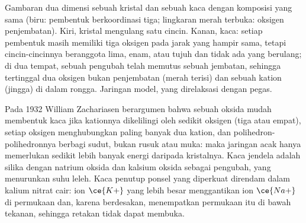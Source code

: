 \begin{omfigure}

{\small Gambaran dua dimensi sebuah kristal dan sebuah kaca dengan komposisi
yang sama (biru: pembentuk berkoordinasi tiga; lingkaran merah terbuka: oksigen
penjembatan). Kiri, kristal mengulang satu cincin. Kanan, kaca: setiap pembentuk
masih memiliki tiga oksigen pada jarak yang hampir sama, tetapi cincin-cincinnya beranggota lima,
enam, atau tujuh dan tidak ada yang berulang; di dua tempat, sebuah pengubah telah memutus sebuah
jembatan, sehingga tertinggal dua oksigen bukan penjembatan (merah terisi) dan sebuah kation (jingga) di dalam
rongga. Jaringan model, yang direlaksasi dengan pegas.}
\end{omfigure}

Pada 1932 William Zachariasen berargumen bahwa sebuah oksida mudah membentuk kaca jika
kationnya dikelilingi oleh sedikit oksigen (tiga atau empat), setiap oksigen menghubungkan paling banyak
dua kation, dan polihedron-polihedronnya berbagi sudut, bukan rusuk atau muka: maka
jaringan acak hanya memerlukan sedikit lebih banyak energi daripada kristalnya. Kaca jendela adalah
silika dengan natrium oksida dan kalsium oksida sebagai pengubah, yang menurunkan suhu
leleh. Kaca penutup ponsel yang diperkuat direndam dalam kalium nitrat
cair: ion $\ce{K+}$ yang lebih besar menggantikan ion $\ce{Na+}$ di permukaan dan, karena berdesakan,
menempatkan permukaan itu di bawah tekanan, sehingga retakan tidak dapat membuka.

